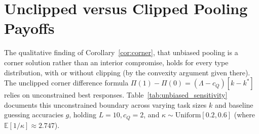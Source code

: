 \documentclass[11pt]{article}
\begin{document}
\section{Unclipped versus Clipped Pooling Payoffs}
\label{sec:unbiased_sensitivity}

The qualitative finding of Corollary~\ref{cor:corner}, that unbiased pooling is a corner solution rather than an interior compromise, holds for every type distribution, with or without clipping (by the convexity argument given there). The unclipped corner difference formula $\Pi(1) - \Pi(0) = (\Lambda - c_Q)[k - k^*]$ relies on unconstrained best responses. Table~\ref{tab:unbiased_sensitivity} documents this unconstrained boundary across varying task sizes $k$ and baseline guessing accuracies $g$, holding $L=10, c_Q=2$, and $\kappa \sim \text{Uniform}[0.2, 0.6]$ (where $\mathbb{E}[1/\kappa] \approx 2.747$).
\end{document}
